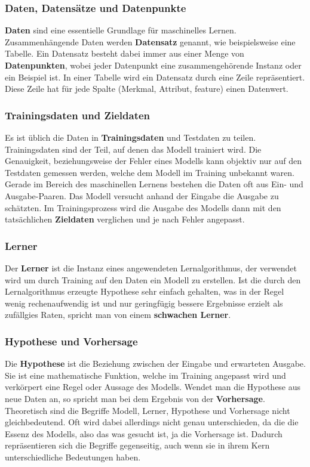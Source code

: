 \subsubsection{Daten, Datensätze und Datenpunkte}
\textbf{Daten} sind eine essentielle Grundlage für maschinelles Lernen. Zusammenhängende Daten werden \textbf{Datensatz} genannt, wie beispielsweise eine Tabelle. Ein Datensatz besteht dabei immer aus einer Menge von \textbf{Datenpunkten}, wobei jeder Datenpunkt eine zusammengehörende Instanz oder ein Beispiel ist. In einer Tabelle wird ein Datensatz durch eine Zeile repräsentiert. Diese Zeile hat für jede Spalte (Merkmal, Attribut, feature) einen Datenwert.

\subsubsection{Trainingsdaten und Zieldaten}
Es ist üblich die Daten in \textbf{Trainingsdaten} und Testdaten zu teilen. Trainingsdaten sind der Teil, auf denen das Modell trainiert wird. Die Genauigkeit, beziehungsweise der Fehler eines Modells kann objektiv nur auf den Testdaten gemessen werden, welche dem Modell im Training unbekannt waren.
\newline
Gerade im Bereich des maschinellen Lernens bestehen die Daten oft aus Ein- und Ausgabe-Paaren. Das Modell versucht anhand der Eingabe die Ausgabe zu schätzten. Im Trainingsprozess wird die Ausgabe des Modells dann mit den tatsächlichen \textbf{Zieldaten} verglichen und je nach Fehler angepasst.

\subsubsection{Lerner}
Der \textbf{Lerner} ist die Instanz eines angewendeten Lernalgorithmus, der verwendet wird um durch Training auf den Daten ein Modell zu erstellen. Ist die durch den Lernalgorithmus erzeugte Hypothese sehr einfach gehalten, was in der Regel wenig rechenaufwendig ist und nur geringfügig bessere Ergebnisse erzielt als zufällgies Raten, spricht man von einem \textbf{schwachen Lerner}.

\subsubsection{Hypothese und Vorhersage}
Die \textbf{Hypothese} ist die Beziehung zwischen der Eingabe und erwarteten Ausgabe. Sie ist eine mathematische Funktion, welche im Training angepasst wird und verkörpert  eine Regel oder Aussage des Modells. 
\newline
Wendet man die Hypothese aus neue Daten an, so spricht man bei dem Ergebnis von der \textbf{Vorhersage}.
\newline
Theoretisch sind die Begriffe Modell, Lerner, Hypothese und Vorhersage nicht gleichbedeutend. Oft wird dabei allerdings nicht genau unterschieden, da die die Essenz des Modells, also das was gesucht ist, ja die Vorhersage ist. Dadurch repräsentieren sich die Begriffe gegenseitig, auch wenn sie in ihrem Kern unterschiedliche Bedeutungen haben.

